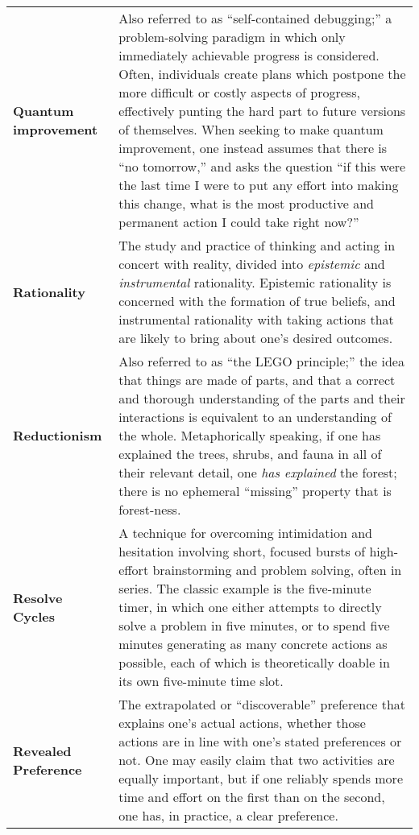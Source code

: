 \begin{longtable} { p{} p{} }
\textbf{Quantum improvement} & Also referred to as ``self-contained debugging;'' a problem-solving paradigm in which only immediately achievable progress is considered.  Often, individuals create plans which postpone the more difficult or costly aspects of progress, effectively punting the hard part to future versions of themselves.  When seeking to make quantum improvement, one instead assumes that there is ``no tomorrow,'' and asks the question ``if this were the last time I were to put any effort into making this change, what is the most productive and permanent action I could take right now?''\\

\textbf{Rationality} & The study and practice of thinking and acting in concert with reality, divided into \emph{epistemic} and \emph{instrumental} rationality.  Epistemic rationality is concerned with the formation of true beliefs, and instrumental rationality with taking actions that are likely to bring about one's desired outcomes.\\

\textbf{Reductionism} & Also referred to as ``the LEGO principle;'' the idea that things are made of parts, and that a correct and thorough understanding of the parts and their interactions is equivalent to an understanding of the whole.  Metaphorically speaking, if one has explained the trees, shrubs, and fauna in all of their relevant detail, one \emph{has explained} the forest; there is no ephemeral ``missing'' property that is forest-ness.\\

\textbf{Resolve Cycles} & A technique for overcoming intimidation and hesitation involving short, focused bursts of high-effort brainstorming and problem solving, often in series.  The classic example is the five-minute timer, in which one either attempts to directly solve a problem in five minutes, or to spend five minutes generating as many concrete actions as possible, each of which is theoretically doable in its own five-minute time slot.\\

\textbf{Revealed Preference} & The extrapolated or ``discoverable'' preference that explains one's actual actions, whether those actions are in line with one's stated preferences or not.  One may easily claim that two activities are equally important, but if one reliably spends more time and effort on the first than on the second, one has, in practice, a clear preference.\\


\end{longtable}
